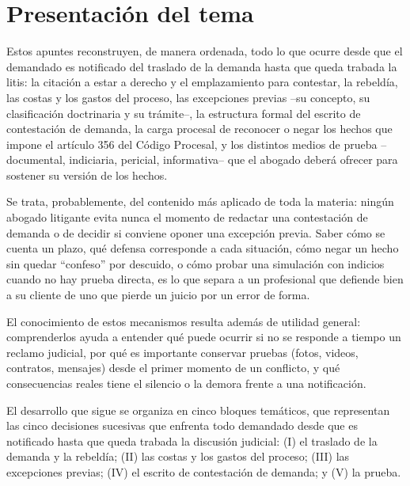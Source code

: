 \documentclass[12pt,oneside]{book}
\begin{document}
\tableofcontents

\chapter*{Presentación del tema}

Estos apuntes reconstruyen, de manera ordenada, todo lo que ocurre desde que el demandado es notificado del traslado de la demanda hasta que queda trabada la litis: la citación a estar a derecho y el emplazamiento para contestar, la rebeldía, las costas y los gastos del proceso, las excepciones previas --su concepto, su clasificación doctrinaria y su trámite--, la estructura formal del escrito de contestación de demanda, la carga procesal de reconocer o negar los hechos que impone el artículo 356 del Código Procesal, y los distintos medios de prueba --documental, indiciaria, pericial, informativa-- que el abogado deberá ofrecer para sostener su versión de los hechos.

Se trata, probablemente, del contenido más aplicado de toda la materia: ningún abogado litigante evita nunca el momento de redactar una contestación de demanda o de decidir si conviene oponer una excepción previa. Saber cómo se cuenta un plazo, qué defensa corresponde a cada situación, cómo negar un hecho sin quedar ``confeso'' por descuido, o cómo probar una simulación con indicios cuando no hay prueba directa, es lo que separa a un profesional que defiende bien a su cliente de uno que pierde un juicio por un error de forma.

El conocimiento de estos mecanismos resulta además de utilidad general: comprenderlos ayuda a entender qué puede ocurrir si no se responde a tiempo un reclamo judicial, por qué es importante conservar pruebas (fotos, videos, contratos, mensajes) desde el primer momento de un conflicto, y qué consecuencias reales tiene el silencio o la demora frente a una notificación.

\begin{note}
El desarrollo que sigue se organiza en cinco bloques temáticos, que representan las cinco decisiones sucesivas que enfrenta todo demandado desde que es notificado hasta que queda trabada la discusión judicial: (I) el traslado de la demanda y la rebeldía; (II) las costas y los gastos del proceso; (III) las excepciones previas; (IV) el escrito de contestación de demanda; y (V) la prueba.
\end{note}
\end{document}
